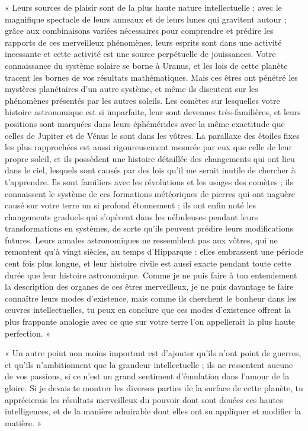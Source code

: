 \documentclass[a4paper, 11pt, oneside, landscape]{article}
\begin{document}
« Leurs sources de plaisir sont de la plus haute nature intellectuelle ; avec le magnifique spectacle de leurs anneaux et de leurs lunes qui gravitent autour ; grâce aux combinaisons variées nécessaires pour comprendre et prédire les rapports de ces merveilleux phénomènes, leurs esprits sont dans une activité incessante et cette activité est une source perpétuelle de jouissances. Votre connaissance du système solaire se borne à Uranus, et les lois de cette planète tracent les bornes de vos résultats mathématiques. Mais ces êtres ont pénétré les mystères planétaires d'un autre système, et même ils discutent sur les phénomènes présentés par les autres soleils. Les comètes sur lesquelles votre histoire astronomique est si imparfaite, leur sont devenues très-familières, et leurs positions sont marquées dans leurs éphémérides avec la même exactitude que celles de Jupiter et de Vénus le sont dans les vôtres. La parallaxe des étoiles fixes les plus rapprochées est aussi rigoureusement mesurée par eux que celle de leur propre soleil, et ils possèdent une histoire détaillée des changements qui ont lieu dans le ciel, lesquels sont causés par des lois qu'il me serait inutile de chercher à t'apprendre. Ils sont familiers avec les révolutions et les usages des comètes ; ils connaissent le système de ces formations météoriques de pierres qui ont naguère causé sur votre terre un si profond étonnement ; ils ont enfin noté les changements graduels qui s'opèrent dans les nébuleuses pendant leurs transformations en systèmes, de sorte qu'ils peuvent prédire leurs modifications futures. Leurs annales astronomiques ne ressemblent pas aux vôtres, qui ne remontent qu'à vingt siècles, au temps d'Hipparque : elles embrassent une période cent fois plus longue, et leur histoire civile est aussi exacte pendant toute cette durée que leur histoire astronomique. Comme je ne puis faire à ton entendement la description des organes de ces êtres merveilleux, je ne puis davantage te faire connaître leurs modes d'existence, mais comme ils cherchent le bonheur dans les œuvres intellectuelles, tu peux en conclure que ces modes d'existence offrent la plus frappante analogie avec ce que sur votre terre l'on appellerait la plus haute perfection. »

« Un autre point non moins important est d'ajouter qu'ils n'ont point de guerres, et qu'ils n'ambitionnent que la grandeur intellectuelle ; ils ne ressentent aucune de vos passions, si ce n'est un grand sentiment d'émulation dans l'amour de la gloire. Si je devais te montrer les diverses parties de la surface de cette planète, tu apprécierais les résultats merveilleux du pouvoir dont sont douées ces hautes intelligences, et de la manière admirable dont elles ont su appliquer et modifier la matière. »
\end{document}
